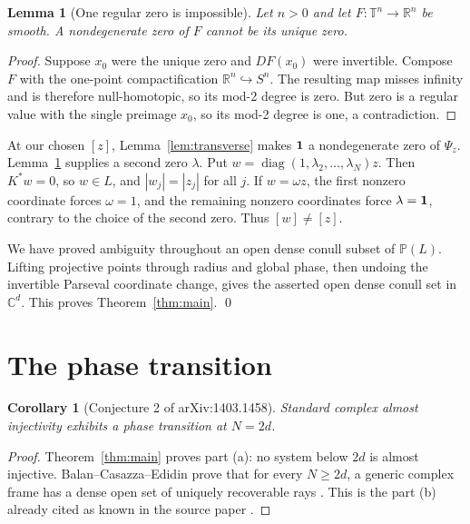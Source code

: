 \documentclass[10pt]{article}
\newtheorem{lemma}[theorem]{Lemma}
\newtheorem{corollary}[theorem]{Corollary}
\newcommand{\T}{\mathbb T}
\newcommand{\C}{\mathbb C}
\newcommand{\PP}{\mathbb P}
\newcommand{\diag}{\operatorname{diag}}
\begin{document}
\begin{lemma}[One regular zero is impossible]
\label{lem:degree}
Let \(n>0\) and let \(F:\T^n\to\mathbb R^n\) be smooth.  A nondegenerate
zero of \(F\) cannot be its unique zero.
\end{lemma}

\begin{proof}
Suppose \(x_0\) were the unique zero and \(DF(x_0)\) were invertible.  Compose
\(F\) with the one-point compactification
\(\mathbb R^n\hookrightarrow S^n\).  The resulting map misses infinity and
is therefore null-homotopic, so its mod-2 degree is zero.  But zero is a
regular value with the single preimage \(x_0\), so its mod-2 degree is one, a
contradiction.
\end{proof}

At our chosen \([z]\), Lemma~\ref{lem:transverse} makes \({\bf1}\) a
nondegenerate zero of \(\Psi_z\).  Lemma~\ref{lem:degree} supplies a second
zero \(\lambda\).  Put
\(w=\diag(1,\lambda_2,\ldots,\lambda_N)z\).  Then
\(K^*w=0\), so \(w\in L\), and \(|w_j|=|z_j|\) for all \(j\).  If
\(w=\omega z\), the first nonzero coordinate forces \(\omega=1\), and the
remaining nonzero coordinates force \(\lambda={\bf1}\), contrary to the
choice of the second zero.  Thus \([w]\ne[z]\).

We have proved ambiguity throughout an open dense conull subset of
\(\PP(L)\).  Lifting projective points through radius and global phase, then
undoing the invertible Parseval coordinate change, gives the asserted open
dense conull set in \(\C^d\).  This proves Theorem~\ref{thm:main}. \qed

\section*{The phase transition}

\begin{corollary}[Conjecture 2 of arXiv:1403.1458]
Standard complex almost injectivity exhibits a phase transition at
\(N=2d\).
\end{corollary}

\begin{proof}
Theorem~\ref{thm:main} proves part (a): no system below \(2d\) is almost
injective.  Balan--Casazza--Edidin prove that for every \(N\ge2d\), a generic
complex frame has a dense open set of uniquely recoverable rays
\cite[Theorem 3.4]{BCE}.  This is the part (b) already cited as known in the
source paper \cite[pp.~22--23]{Mixon}.
\end{proof}
\end{document}
